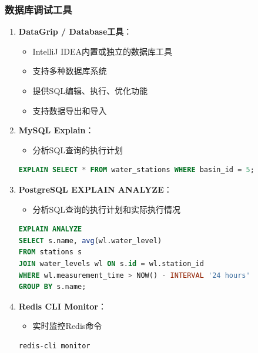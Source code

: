 \subsubsection{数据库调试工具}\label{ux6570ux636eux5e93ux8c03ux8bd5ux5de5ux5177}

\begin{enumerate}
\def\labelenumi{\arabic{enumi}.}
\tightlist
\item
  \textbf{DataGrip / Database工具}：

  \begin{itemize}
  \tightlist
  \item
    IntelliJ IDEA内置或独立的数据库工具
  \item
    支持多种数据库系统
  \item
    提供SQL编辑、执行、优化功能
  \item
    支持数据导出和导入
  \end{itemize}
\item
  \textbf{MySQL Explain}：

  \begin{itemize}
  \tightlist
  \item
    分析SQL查询的执行计划
  \end{itemize}

\begin{lstlisting}[language=SQL]
EXPLAIN SELECT * FROM water_stations WHERE basin_id = 5;
\end{lstlisting}
\item
  \textbf{PostgreSQL EXPLAIN ANALYZE}：

  \begin{itemize}
  \tightlist
  \item
    分析SQL查询的执行计划和实际执行情况
  \end{itemize}

\begin{lstlisting}[language=SQL]
EXPLAIN ANALYZE 
SELECT s.name, avg(wl.water_level) 
FROM stations s 
JOIN water_levels wl ON s.id = wl.station_id 
WHERE wl.measurement_time > NOW() - INTERVAL '24 hours' 
GROUP BY s.name;
\end{lstlisting}
\item
  \textbf{Redis CLI Monitor}：

  \begin{itemize}
  \tightlist
  \item
    实时监控Redis命令
  \end{itemize}

\begin{lstlisting}[language=bash]
redis-cli monitor
\end{lstlisting}
\end{enumerate}

